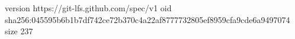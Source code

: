 version https://git-lfs.github.com/spec/v1
oid sha256:045595b6b1b7df742ce72b370c4a22af8777732805ef8959cfa9cde6a9497074
size 237
